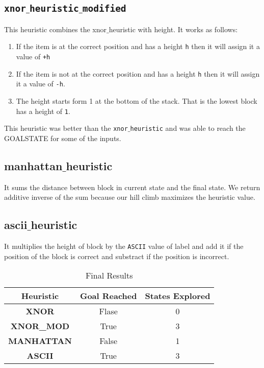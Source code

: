 \documentclass[a4paper,10pt,reqno,oneside]{amsart}
\begin{document}
\subsection*{\texttt{xnor$\_$heuristic$\_$modified}}
This heuristic combines the xnor$\_$heuristic with height.
It works as follows:
\begin{enumerate}
    \item If the item is at the correct position and has a height \texttt{h} then it will assign it a value of \texttt{+h}
    \item If the item is not at the correct position and has a height \texttt{h} then it will assign it a value of \texttt{-h}.
    \item The height starts form 1 at the bottom of the stack. That is the lowest block has a height of \texttt{1}.
\end{enumerate}
\newline
This heuristic was better than the \texttt{xnor$\_$heuristic} and was able to reach the GOALSTATE for some of the inputs.

\subsection*{manhattan$\_$heuristic}
It sums the distance between block in current state and the final state. We return additive inverse of the sum
because our hill climb maximizes the heuristic value.

\subsection*{ascii$\_$heuristic}
It multiplies the height of block by the \texttt{ASCII} value of label and add it if the position of the block 
is correct and substract if the position is incorrect.

\begin{table}[h]
    \begin{tabular}{|c|c|c|}
    \hline
    \textbf{Heuristic} & \textbf{Goal Reached} & \textbf{States Explored} \\ \hline
    \textbf{XNOR}      & Flase                 & 0                        \\ \hline
    \textbf{XNOR\_MOD} & True                  & 3                        \\ \hline
    \textbf{MANHATTAN} & False                 & 1                        \\ \hline
    \textbf{ASCII}     & True                  & 3                        \\ \hline
    \end{tabular}
    \caption{Final Results}
\end{table}
\end{document}
